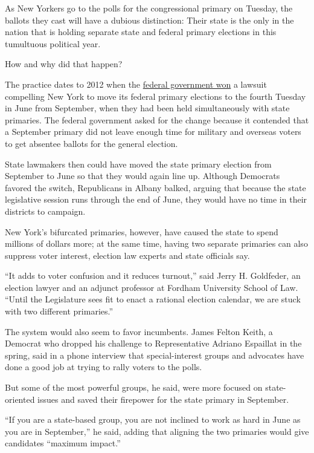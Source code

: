 As New Yorkers go to the polls for the congressional primary on Tuesday,
the ballots they cast will have a dubious distinction: Their state is
the only in the nation that is holding separate state and federal
primary elections in this tumultuous political year.

How and why did that happen?

The practice dates to 2012 when the
\href{https://cityroom.blogs.nytimes3xbfgragh.onion/2012/01/27/judge-moves-congressional-primary-date-to-june/}{federal
government won} a lawsuit compelling New York to move its federal
primary elections to the fourth Tuesday in June from September, when
they had been held simultaneously with state primaries. The federal
government asked for the change because it contended that a September
primary did not leave enough time for military and overseas voters to
get absentee ballots for the general election.

State lawmakers then could have moved the state primary election from
September to June so that they would again line up. Although Democrats
favored the switch, Republicans in Albany balked, arguing that because
the state legislative session runs through the end of June, they would
have no time in their districts to campaign.

New York's bifurcated primaries, however, have caused the state to spend
millions of dollars more; at the same time, having two separate
primaries can also suppress voter interest, election law experts and
state officials say.

``It adds to voter confusion and it reduces turnout,'' said Jerry H.
Goldfeder, an election lawyer and an adjunct professor at Fordham
University School of Law. ``Until the Legislature sees fit to enact a
rational election calendar, we are stuck with two different primaries.''

The system would also seem to favor incumbents. James Felton Keith, a
Democrat who dropped his challenge to Representative Adriano Espaillat
in the spring, said in a phone interview that special-interest groups
and advocates have done a good job at trying to rally voters to the
polls.

But some of the most powerful groups, he said, were more focused on
state-oriented issues and saved their firepower for the state primary in
September.

``If you are a state-based group, you are not inclined to work as hard
in June as you are in September,'' he said, adding that aligning the two
primaries would give candidates ``maximum impact.''

